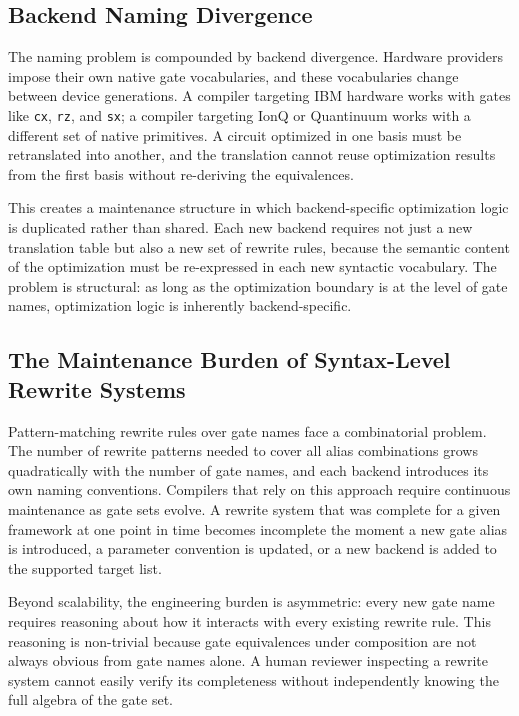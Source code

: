 \documentclass[conference]{IEEEtran}
\begin{document}
\subsection{Backend Naming Divergence}

The naming problem is compounded by backend divergence. Hardware providers impose their
own native gate vocabularies, and these vocabularies change between device generations.
A compiler targeting IBM hardware works with gates like \texttt{cx}, \texttt{rz}, and
\texttt{sx}; a compiler targeting IonQ or Quantinuum works with a different set of native
primitives. A circuit optimized in one basis must be retranslated into another, and the
translation cannot reuse optimization results from the first basis without re-deriving
the equivalences.

This creates a maintenance structure in which backend-specific optimization logic is
duplicated rather than shared. Each new backend requires not just a new translation table
but also a new set of rewrite rules, because the semantic content of the optimization
must be re-expressed in each new syntactic vocabulary. The problem is structural: as long
as the optimization boundary is at the level of gate names, optimization logic is
inherently backend-specific.

\subsection{The Maintenance Burden of Syntax-Level Rewrite Systems}

Pattern-matching rewrite rules over gate names face a combinatorial problem. The number
of rewrite patterns needed to cover all alias combinations grows quadratically with the
number of gate names, and each backend introduces its own naming conventions. Compilers
that rely on this approach require continuous maintenance as gate sets evolve. A rewrite
system that was complete for a given framework at one point in time becomes incomplete
the moment a new gate alias is introduced, a parameter convention is updated, or a new
backend is added to the supported target list.

Beyond scalability, the engineering burden is asymmetric: every new gate name
requires reasoning about how it interacts with every existing rewrite rule. This
reasoning is non-trivial because gate equivalences under composition are not always
obvious from gate names alone. A human reviewer inspecting a rewrite system cannot easily
verify its completeness without independently knowing the full algebra of the gate set.
\end{document}
